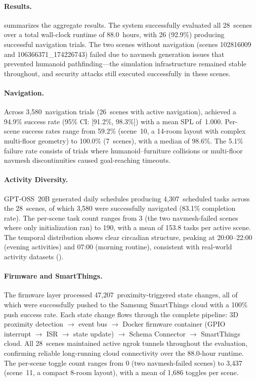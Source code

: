 \paragraph{Results.}



 summarizes the aggregate results.
The system successfully evaluated all 28~scenes over a total
wall-clock runtime of 88.0~hours, with 26 (92.9\%)
producing successful navigation trials.  The two scenes without
navigation (scenes 102816009 and 106366371\_174226743) failed
due to navmesh generation issues that prevented humanoid
pathfinding---the simulation infrastructure remained stable
throughout, and security attacks still executed successfully in
these scenes.

\paragraph{Navigation.}
Across 3{,}580~navigation trials (26~scenes with active navigation),
\sys{} achieved a 94.9\% success rate (95\% CI: [91.2\%, 98.3\%])
with a mean SPL of~1.000.
Per-scene success rates range from 59.2\% (scene~10, a 14-room
layout with complex multi-floor geometry) to 100.0\% (7~scenes),
with a median of 98.6\%.  The 5.1\% failure rate consists of
trials where humanoid--furniture collisions or multi-floor navmesh
discontinuities caused goal-reaching timeouts.

\paragraph{Activity Diversity.}
GPT-OSS~20B generated daily schedules producing
4{,}307~scheduled tasks across the 28~scenes, of which
3{,}580 were successfully navigated (83.1\% completion rate).
The per-scene task count ranges from 3 (the two navmesh-failed
scenes where only initialization ran) to 190, with a
mean of 153.8 tasks per active scene.
The temporal distribution shows clear circadian structure, peaking
at 20:00--22:00 (evening activities) and 07:00 (morning routine),
consistent with real-world activity datasets ().



\paragraph{Firmware and SmartThings.}
The firmware layer processed 47{,}207~proximity-triggered state
changes, all of which were successfully pushed to the Samsung
SmartThings cloud with a 100\% push success rate.  Each state
change flows through the complete pipeline: 3D proximity detection
$\to$ event bus $\to$ Docker firmware container (GPIO interrupt
$\to$ ISR $\to$ state update) $\to$ Schema Connector $\to$
SmartThings cloud.  All 28~scenes maintained active ngrok tunnels
throughout the evaluation, confirming reliable long-running cloud
connectivity over the 88.0-hour runtime.  The per-scene toggle
count ranges from 0 (two navmesh-failed scenes) to 3{,}437
(scene~11, a compact 8-room layout), with a mean of 1{,}686
toggles per scene.

